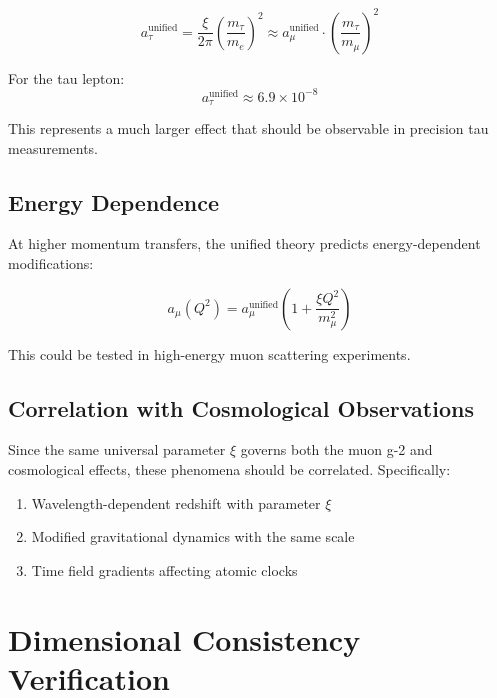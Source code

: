\documentclass[12pt,a4paper]{article}
\newcommand{\xipar}{\xi}
\begin{document}
	\begin{equation}
		a_\tau^{\text{unified}} = \frac{\xipar}{2\pi}\left(\frac{m_\tau}{m_e}\right)^2 \approx a_\mu^{\text{unified}} \cdot \left(\frac{m_\tau}{m_\mu}\right)^2
	\end{equation}
	
	For the tau lepton:
	\begin{equation}
		a_\tau^{\text{unified}} \approx 6.9 \times 10^{-8}
	\end{equation}
	
	This represents a much larger effect that should be observable in precision tau measurements.
	
	\subsection{Energy Dependence}
	\label{subsec:energy_dependence}
	
	At higher momentum transfers, the unified theory predicts energy-dependent modifications:
	
	\begin{equation}
		a_\mu(Q^2) = a_\mu^{\text{unified}} \left(1 + \frac{\xipar Q^2}{m_\mu^2}\right)
	\end{equation}
	
	This could be tested in high-energy muon scattering experiments.
	
	\subsection{Correlation with Cosmological Observations}
	\label{subsec:cosmological_correlations}
	
	Since the same universal parameter $\xipar$ governs both the muon g-2 and cosmological effects, these phenomena should be correlated. Specifically:
	
	\begin{enumerate}
		\item Wavelength-dependent redshift with parameter $\xipar$
		\item Modified gravitational dynamics with the same scale
		\item Time field gradients affecting atomic clocks
	\end{enumerate}
	
	\section{Dimensional Consistency Verification}
	
\end{document}
